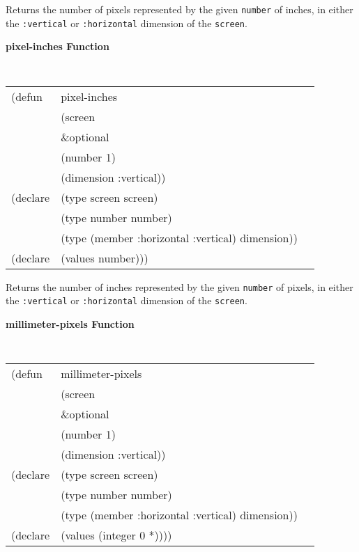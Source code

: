 \begin{flushright} \parbox[t]{6.125in}{
Returns the number of pixels represented by the given {\tt number} of inches, in
either the {\tt :vertical} or {\tt :horizontal} dimension of the {\tt screen}.
}\end{flushright}


{\samepage
{\large {\bf pixel-inches \hfill Function}} 
\begin{flushright} 
\parbox[t]{6.125in}{
\tt
\begin{tabular}{lll}
\raggedright
(defun & pixel-inches \\
       & (screen \\
       & \&optional \\
       & (number 1) \\
       & (dimension :vertical))\\
(declare & (type screen  screen)\\
	  &(type number  number)\\
	  &(type (member :horizontal :vertical)  dimension)) \\ 
(declare & (values number)))
\end{tabular}
\rm
}\end{flushright}}

\begin{flushright} \parbox[t]{6.125in}{
Returns the number of inches represented by the given {\tt number} of pixels, in
either the {\tt :vertical} or {\tt :horizontal} dimension of the {\tt screen}.
}\end{flushright}


{\samepage
{\large {\bf millimeter-pixels \hfill Function}} 
\begin{flushright} 
\parbox[t]{6.125in}{
\tt
\begin{tabular}{lll}
\raggedright
(defun & millimeter-pixels \\
       & (screen \\
       & \&optional \\
       & (number 1) \\
       & (dimension :vertical))\\
(declare & (type screen  screen)\\
	  &(type number  number)\\
	  &(type (member :horizontal :vertical)  dimension)) \\ 
(declare & (values (integer 0 *))))
\end{tabular}
\rm
}\end{flushright}}

